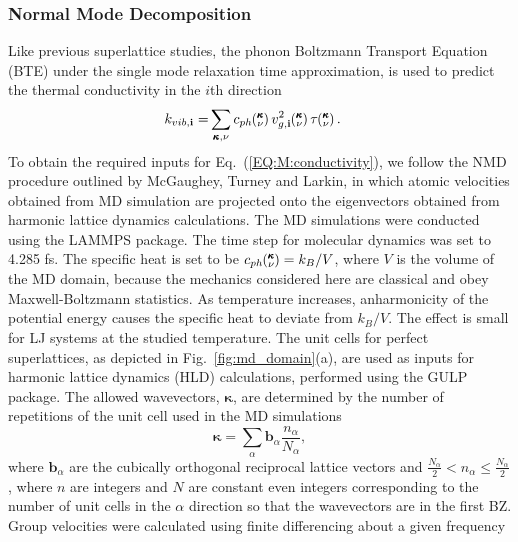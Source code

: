 \documentclass[aps,prb,preprint,preprintnumbers,amsmath,amssymb,floatfix,superscriptaddress]{revtex4}
\newcommand{\kv}{\mspace{-4.0mu}\left(\mspace{-8.0mu}
\begin{smallmatrix}&\pmb{\kappa} \\&\nu\end{smallmatrix}
\mspace{-3.0mu}\right)}
\begin{document}
\subsubsection{Normal Mode Decomposition}
Like previous superlattice studies, \cite{Luckyanova16112012,doi:10.1021/nl202186y} the phonon Boltzmann Transport Equation (BTE) under the single mode relaxation time approximation,\cite{ziman_electrons_2001} is used to predict the thermal conductivity in the $i$th direction
\begin{equation}\label{EQ:M:conductivity}
\begin{split}
k_{vib,\mathbf{i}}=&\sum_{\pmb{\kappa},\nu} c_{ph}\kv
v^{2}_{g,\mathbf{i}}\kv \tau\kv.
\end{split}
\end{equation}
To obtain the required inputs for Eq.~(\ref{EQ:M:conductivity}), we follow the NMD procedure outlined by McGaughey\cite{PhysRevB.71.184305}, Turney \cite {PhysRevB.81.081411} and Larkin,\cite{jason_inpress} in which atomic velocities obtained from MD simulation are projected onto the eigenvectors obtained from harmonic lattice dynamics calculations. The MD simulations were conducted using the LAMMPS package.\cite{LAMMPS} The time step for molecular dynamics was set to 4.285 fs. The specific heat is set to be $c_{ph}\kv=k_B/V$, where $V$ is the volume of the MD domain, because the mechanics considered here are classical and obey Maxwell-Boltzmann statistics. As temperature increases, anharmonicity of the potential energy causes the specific heat to deviate from $k_B/V$. The effect is small for LJ systems at the studied temperature.\cite{jason_inpress} The unit cells for perfect superlattices, as depicted in Fig.~\ref{fig:md_domain}(a), are used as inputs for harmonic lattice dynamics (HLD) calculations, performed using the GULP package.\cite{GULP} The allowed wavevectors, $\pmb{\kappa}$, are determined by the number of repetitions of the unit cell used in the MD simulations
\begin{equation}\label{EQ:NMD:allowdkpt}
\pmb{\kappa} = \sum_{\alpha} \pmb{b}_{\alpha} \frac{n_{\alpha}}{N_{\alpha}},
\end{equation}
where $\pmb{b}_\alpha$ are the cubically orthogonal reciprocal lattice vectors and $ \frac{N_\alpha}{2} < n_\alpha \le \frac {N_\alpha}{2}$, where $n$ are integers and $N$ are constant even integers corresponding to the number of unit cells in the $\alpha$ direction so that the wavevectors are in the first BZ. Group velocities were calculated using finite differencing about a given frequency
\end{document}
